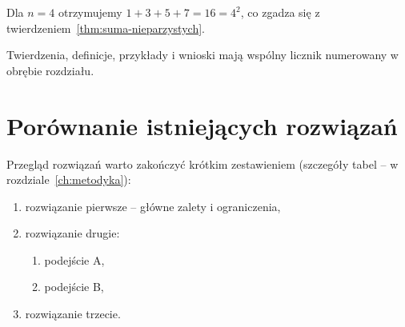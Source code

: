 \begin{example}
    Dla $n = 4$ otrzymujemy $1 + 3 + 5 + 7 = 16 = 4^2$, co zgadza się z twierdzeniem~\ref{thm:suma-nieparzystych}.
\end{example}

\begin{remark}
    Twierdzenia, definicje, przykłady i wnioski mają wspólny licznik numerowany w obrębie rozdziału.
\end{remark}

\section{Porównanie istniejących rozwiązań}\label{sec:porownanie}

Przegląd rozwiązań warto zakończyć krótkim zestawieniem (szczegóły tabel -- w rozdziale~\ref{ch:metodyka}):
\begin{enumerate}
    \item rozwiązanie pierwsze -- główne zalety i ograniczenia,
    \item rozwiązanie drugie:
    \begin{enumerate}
        \item podejście A,
        \item podejście B,
    \end{enumerate}
    \item rozwiązanie trzecie.
\end{enumerate}
